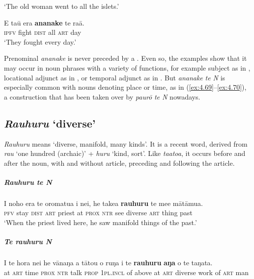 \glt 
‘The old woman went to all the islets.’ \textstyleExampleref{[Mtx-3-06.045]}
\z

\ea\label{ex:4.70}
\gll E taū era \textbf{ananake} te ra{\ꞌ}ā. \\
\textsc{ipfv} fight \textsc{dist} all \textsc{art} day \\

\glt
‘They fought every day.’ \textstyleExampleref{[Mtx-3-05.006]}
\z

Prenominal \textit{ananake} is never preceded by a . Even so, the examples show that it may occur in noun phrases with a variety of functions, for example subject as in , locational adjunct as in , or temporal adjunct as in . But \textit{ananake} \textit{te N} is especially common with nouns denoting place or time, as in (\ref{ex:4.69}–\ref{ex:4.70}), a construction that has been taken over by \textit{paurō} \textit{te N} nowadays. 

\subsection{\textit{Rauhuru} ‘diverse’}\label{sec:4.4.5}
\textit{Rauhuru} means ‘diverse, manifold, many kinds’. It is a recent word, derived from \textit{rau} ‘one hundred (archaic)’ + \textit{huru} ‘kind, sort’. Like \textit{ta{\ꞌ}ato{\ꞌ}a}, it occurs before and after the noun, with and without article, preceding and following the article.

\subparagraph{\textit{Rauhuru te N}}

\ea\label{ex:4.71}
\gll I noho era te oromatu{\ꞌ}a {\ꞌ}i nei, he take{\ꞌ}a \textbf{rauhuru} te me{\ꞌ}e mātāmu{\ꞌ}a. \\
\textsc{pfv} stay \textsc{dist} \textsc{art} priest at \textsc{prox} \textsc{ntr} see diverse \textsc{art} thing past \\

\glt 
‘When the priest lived here, he saw manifold things of the past.’ \textstyleExampleref{[R423.021]} 
\z

\subparagraph{\textit{Te rauhuru N}}

\ea\label{ex:4.72}
\gll {\ꞌ}I te hora nei he vānaŋa a tātou o ruŋa i te \textbf{rauhuru} \textbf{aŋa}  o te taŋata.\\
at \textsc{art} time \textsc{prox} \textsc{ntr} talk \textsc{prop} \textsc{1pl.incl} of above at \textsc{art} diverse work  of \textsc{art} man\\

